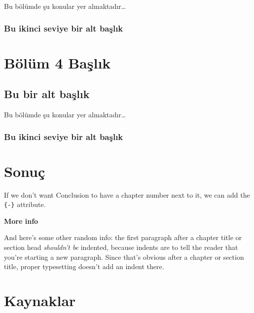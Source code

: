 \documentclass[12pt,twoside]{deuthesis}
\begin{document}
Bu bölümde şu konular yer almaktadır\ldots{}

\hypertarget{bu-ikinci-seviye-bir-alt-baux15flux131k}{%
\subsection{Bu ikinci seviye bir alt başlık}\label{bu-ikinci-seviye-bir-alt-baux15flux131k}}

\hypertarget{Bolum5}{%
\chapter{Bölüm 4 Başlık}\label{Bolum5}}

\hypertarget{bu-bir-alt-baux15flux131k-1}{%
\section{Bu bir alt başlık}\label{bu-bir-alt-baux15flux131k-1}}

Bu bölümde şu konular yer almaktadır\ldots{}

\hypertarget{bu-ikinci-seviye-bir-alt-baux15flux131k-1}{%
\subsection{Bu ikinci seviye bir alt başlık}\label{bu-ikinci-seviye-bir-alt-baux15flux131k-1}}

\hypertarget{sonuuxe7}{%
\chapter*{Sonuç}\label{sonuuxe7}}

If we don't want Conclusion to have a chapter number next to it, we can add the \texttt{\{-\}} attribute.

\textbf{More info}

And here's some other random info: the first paragraph after a chapter title or section head \emph{shouldn't be} indented, because indents are to tell the reader that you're starting a new paragraph. Since that's obvious after a chapter or section title, proper typesetting doesn't add an indent there.

\hypertarget{kaynaklar}{%
\chapter*{Kaynaklar}\label{kaynaklar}}
\end{document}
